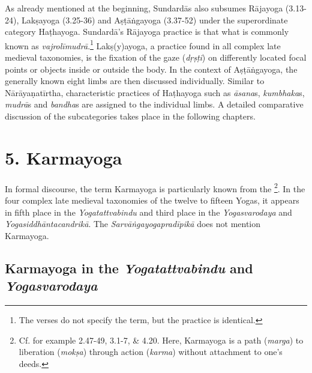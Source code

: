 As already mentioned at the beginning, Sundardās also subsumes Rājayoga (3.13-24), Lakṣayoga (3.25-36) and Aṣṭāṅgayoga (3.37-52) under the superordinate category Haṭhayoga. Sundardā's Rājayoga practice is that what is commonly known as \textit{vajrolīmudrā}.\footnote{The verses do not specify the term, but the practice is identical.} Lakṣ(y)ayoga, a practice found in all complex late medieval taxonomies, is the fixation of the gaze (\textit{dṛṣṭi}) on differently located focal points or objects inside or outside the body. In the context of Aṣṭāṅgayoga, the generally known eight limbs are then discussed individually. Similar to Nārāyaṇatīrtha, characteristic practices of Haṭhayoga such as \textit{āsana}s, \textit{kumbhaka}s, \textit{mudrā}s and \textit{bandha}s are assigned to the individual limbs. A detailed comparative discussion of the subcategories takes place in the following chapters.

\section{5. Karmayoga}
\label{karmayogaintro}

In formal discourse, the term Karmayoga is particularly known from the \footnote{Cf. for example  2.47-49, 3.1-7, \& 4.20. Here, Karmayoga is a path (\textit{marga}) to liberation (\textit{mokṣa}) through action (\textit{karma}) without attachment to one's deeds.}. In the four complex late medieval taxonomies of the twelve to fifteen Yogas, it appears in fifth place in the \textit{Yogatattvabindu} and third place in the \textit{Yogasvarodaya} and \textit{Yogasiddhāntacandrikā}. The \textit{Sarvāṅgayogapradīpikā} does not mention Karmayoga. 

\subsection{Karmayoga in the \textit{Yogatattvabindu} and \textit{Yogasvarodaya}}

